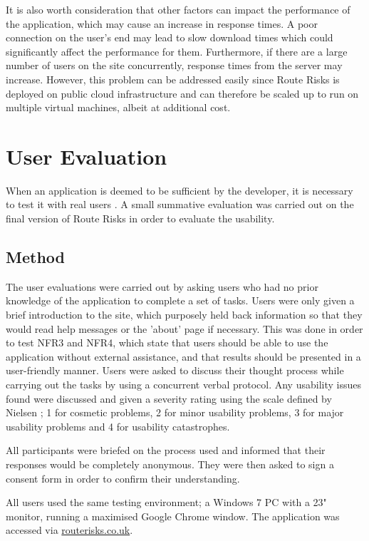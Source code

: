 \documentclass[authoryearcitations]{UoYCSproject}
\begin{document}
It is also worth consideration that other factors can impact the performance of the application, which may cause an increase in response times. A poor connection on the user's end may lead to slow download times which could significantly affect the performance for them. Furthermore, if there are a large number of users on the site concurrently, response times from the server may increase. However, this problem can be addressed easily since Route Risks is deployed on public cloud infrastructure and can therefore be scaled up to run on multiple virtual machines, albeit at additional cost.


\section{User Evaluation}

When an application is deemed to be sufficient by the developer, it is necessary to test it with real users \citep{Cooper2007}. A small summative evaluation was carried out on the final version of Route Risks in order to evaluate the usability. 

\subsection{Method}

The user evaluations were carried out by asking users who had no prior knowledge of the application to complete a set of tasks. Users were only given a brief introduction to the site, which purposely held back information so that they would read help messages or the 'about' page if necessary. This was done in order to test NFR3 and NFR4, which state that users should be able to use the application without external assistance, and that results should be presented in a user-friendly manner. Users were asked to discuss their thought process while carrying out the tasks by using a concurrent verbal protocol. Any usability issues found were discussed and given a severity rating using the scale defined by Nielsen \citep{Nielsen1995}; 1 for cosmetic problems, 2 for minor usability problems, 3 for major usability problems and 4 for usability catastrophes.

All participants were briefed on the process used and informed that their responses would be completely anonymous. They were then asked to sign a consent form in order to confirm their understanding. 

All users used the same testing environment; a Windows 7 PC with a 23" monitor, running a maximised Google Chrome window. The application was accessed via \url{routerisks.co.uk}.
\end{document}
